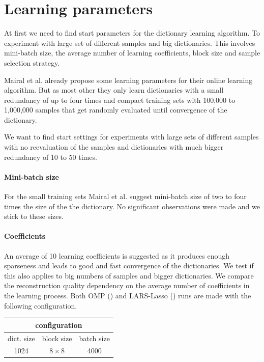 \section{Learning parameters}
At first we need to find start parameters for the dictionary learning
algorithm. To experiment with large set of different samples and big
dictionaries. This involves mini-batch size, the average number of learning
coefficients, block size and sample selection strategy.

Mairal et al. already propose some learning parameters for their online
learning algorithm. But as most other they only learn dictionaries with
a small redundancy of up to four times and compact training sets with 100,000
to 1,000,000 samples that get randomly evaluated until convergence of the
dictionary.

We want to find start settings for experiments with large sets of
different samples with no reevaluation of the samples and dictionaries
with much bigger redundancy of 10 to 50 times.

\paragraph{Mini-batch size}
For the small training sets Mairal et al. suggest mini-batch size of two to four
times the size of the the dictionary. No significant observations were made
and we stick to these sizes. 

\paragraph{Coefficients}
An average of 10 learning coefficients is suggested as it produces enough
sparseness and leads to good and fast convergence of the dictionaries.
We test if this also applies to big numbers of samples and bigger
dictionaries. We compare the reconstruction quality dependency on the average
number of coefficients in the learning process. 
Both OMP () and LARS-Lasso
() runs are made with the following
configuration.
\begin{table}[H]
\centering
\begin{tabular}{| c | c | c |}
\hline
\multicolumn{3}{|c|}{configuration}\\
\hline
dict. size & block size & batch size \\
\hline
1024 & $8\times 8$ & 4000  \\
\hline
\end{tabular}
\end{table}

